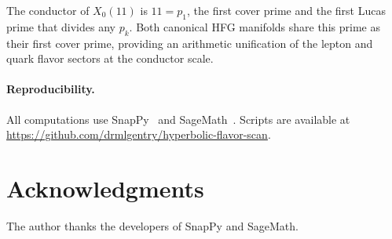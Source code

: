 \documentclass[11pt,a4paper]{article}
\theoremstyle{definition}
\newcommand{\pk}{p_k}
\newcommand{\Xo}{X_0(11)}
\begin{document}
The conductor of $\Xo$ is $11 = p_1$, the first cover prime and
the first Lucas prime that divides any $\pk$.
Both canonical HFG manifolds share this prime as their first
cover prime, providing an arithmetic unification of the lepton
and quark flavor sectors at the conductor scale.

\paragraph{Reproducibility.}
All computations use SnapPy~\cite{SnapPy} and SageMath~\cite{Sage}.
Scripts are available at
\url{https://github.com/drmlgentry/hyperbolic-flavor-scan}.

\section*{Acknowledgments}

The author thanks the developers of SnapPy and SageMath.
\end{document}
